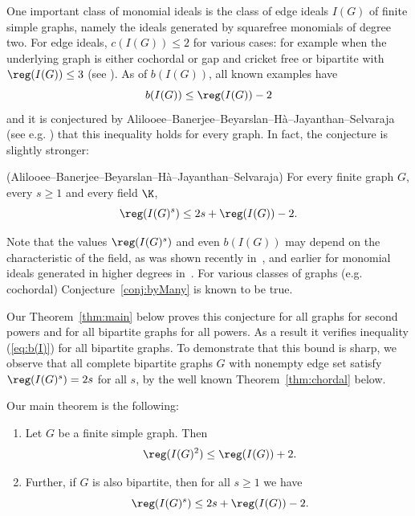 One important class of monomial ideals is the class of edge ideals $I(G)$ of finite simple graphs, namely the ideals generated by squarefree monomials of degree two. For edge ideals, $c(I(G))\le 2$ for various cases: for example when the underlying graph is either cochordal or gap and cricket free or bipartite with $\reg(I(G))\leq 3$
 (see \cite{banerjee1,banerjee,BBH17,froberg}). %
 As of $b(I(G))$, all known examples have
 \begin{equation}\label{eq:b(I)}
b(I(G))\leq \reg(I(G))-2
 \end{equation}
 and it is conjectured by Alilooee--Banerjee--Beyarslan--H\`a--Jayanthan--Selvaraja (see e.g. \cite{BBH17,JS18}) that this inequality holds for every graph.  In fact, the conjecture is
slightly stronger:
\begin{conj}\label{conj:byMany}\textup{(Alilooee--Banerjee--Beyarslan--H\`a--Jayanthan--Selvaraja)}
For every finite graph $G$, every $s\geq 1$ and every field $\K$,  $$\reg(I(G)^s)\leq 2s+ \reg(I(G))-2.$$
\end{conj}
Note that the values $\reg(I(G)^s)$ and even $b(I(G))$ may depend on the characteristic of the field, as was shown recently in~\cite[Exa. 1.2]{minh_vu}, and earlier for monomial ideals generated in higher degrees in~\cite{machia}.
For various classes of graphs (e.g. cochordal)
 Conjecture~\ref{conj:byMany} is known to be true.

  Our Theorem~\ref{thm:main} below proves this conjecture for all graphs for second powers and for all bipartite graphs for all powers. As a result it verifies inequality (\ref{eq:b(I)}) for all bipartite graphs.
 To demonstrate that this bound is sharp, we observe that all complete bipartite graphs $G$ with nonempty edge set satisfy $\reg(I(G)^s)=2s$ for all $s$, by the well known Theorem~\ref{thm:chordal} below.


 Our main theorem is the following:
\begin{theorem}
\begin{enumerate}[label=(\roman*)]
\item \label{it:1} Let $G$ be a finite simple graph. Then
$$ \text{ }\reg(I(G)^2) \leq \reg (I(G))+2.$$
\item \label{it:2} Further, if $G$ is also bipartite, then for all $s\geq 1$ we have $$\text{ } \reg(I(G)^s) \leq 2s+\reg (I(G))-2.$$
\end{enumerate}
\label{thm:main}
\end{theorem}

